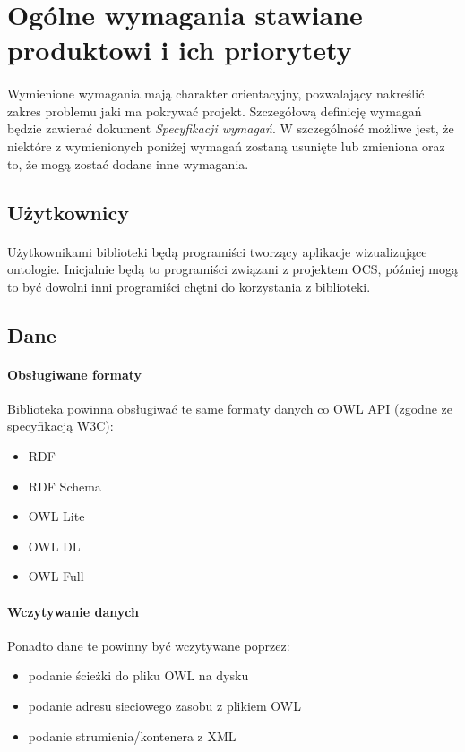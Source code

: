 \documentclass[a4paper,10pt]{article}
\begin{document}
\section{Ogólne wymagania stawiane produktowi i ich priorytety}
\paragraph{} Wymienione wymagania mają charakter orientacyjny, pozwalający nakreślić zakres problemu jaki ma pokrywać projekt. Szczegółową definicję wymagań będzie zawierać dokument \textit{Specyfikacji wymagań}. W szczególność możliwe jest, że niektóre z wymienionych poniżej wymagań zostaną usunięte lub zmieniona oraz to, że mogą zostać dodane inne wymagania.  

\subsection{Użytkownicy}
\paragraph{} Użytkownikami biblioteki będą programiści tworzący aplikacje wizualizujące ontologie. Inicjalnie będą to programiści związani z projektem OCS, później mogą to być dowolni inni programiści chętni do korzystania z biblioteki.  
\subsection{Dane}
\paragraph{Obsługiwane formaty} Biblioteka powinna obsługiwać te same formaty danych co OWL API (zgodne ze specyfikacją W3C):
\begin{itemize}
 	\item RDF
	\item RDF Schema
	\item OWL Lite
	\item OWL DL
	\item OWL Full
\end{itemize}

\paragraph{Wczytywanie danych}Ponadto dane te powinny być wczytywane poprzez:
\begin{itemize}
 	\item podanie ścieżki do pliku OWL na dysku 
	\item podanie adresu sieciowego zasobu z plikiem OWL
	\item podanie strumienia/kontenera z XML 
\end{itemize}
\end{document}
